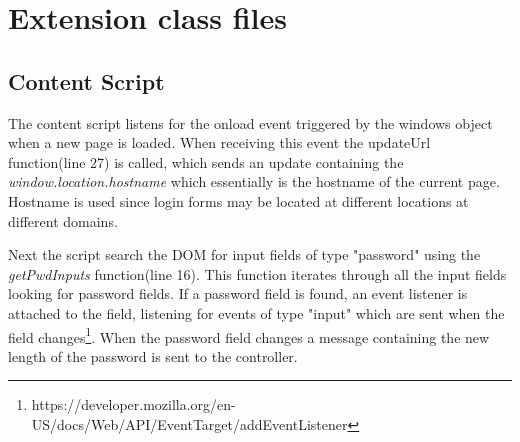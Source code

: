 \chapter{Extension class files}\label{extension-classes}

\section{Content Script}\label{app:content-script}


The content script listens for the onload event triggered by the windows object when a new page is loaded. When receiving this event the updateUrl function(line 27) is called, which sends an update containing the \emph{window.location.hostname} which essentially is the hostname of the current page. Hostname is used since login forms may be located at different locations at different domains.
\par Next the script search the DOM for input fields of type "password" using the \emph{getPwdInputs} function(line 16). This function iterates through all the input fields looking for password fields. If a password field is found, an event listener is attached to the field, listening for events of type "input" which are sent when the field changes\footnote{https://developer.mozilla.org/en-US/docs/Web/API/EventTarget/addEventListener}. When the password field changes a message containing the new length of the password is sent to the controller. 

